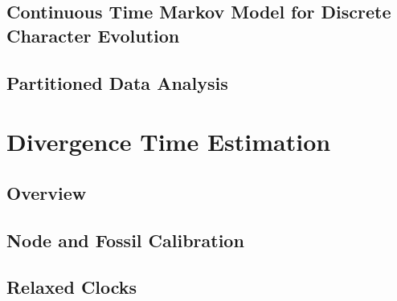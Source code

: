 \documentclass[11pt]{book}
\begin{document}
\chapter{Continuous Time Markov Model for Discrete Character Evolution}
\def \ResourcePath {RB_CTMC_Tutorial/}


\chapter{Partitioned Data Analysis}
\def \ResourcePath {RB_Partition_Tutorial/}






\part{Divergence Time Estimation}

%

\chapter{Overview}
\def \ResourcePath {RB_DivergenceTime_Tutorial/}


\chapter{Node and Fossil Calibration}
\def \ResourcePath {RB_DivergenceTime_Calibration_Tutorial/}


\chapter{Relaxed Clocks}
\def \ResourcePath {RB_DivergenceTime_RelaxedClock_Tutorial/}


%
\end{document}
